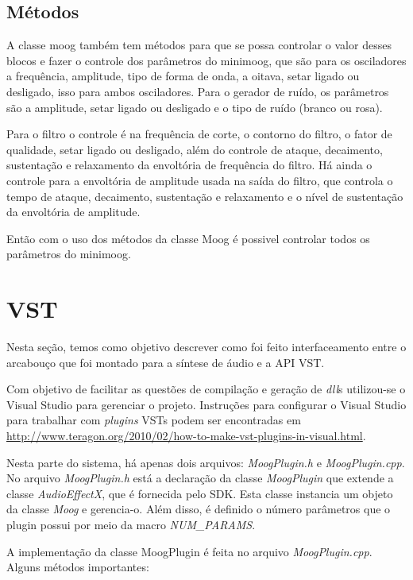 \documentclass{article}
\begin{document}
  
\subsection{Métodos}
A classe moog também tem métodos para que se possa controlar o valor desses blocos e fazer o controle dos parâmetros do minimoog, que são
 para os osciladores a frequência, amplitude, tipo de forma de onda, a oitava, setar ligado ou desligado, isso para ambos osciladores.
Para o gerador de ruído, os parâmetros são a amplitude, setar ligado ou desligado e o tipo de ruído (branco ou rosa).


Para o filtro o controle é na frequência de corte, o contorno do filtro, o fator de qualidade, setar ligado ou desligado, além do controle
 de ataque, decaimento, sustentação e relaxamento da envoltória de frequência do filtro.
Há ainda o controle para a envoltória de amplitude usada na saída do filtro, que controla o tempo de ataque, decaimento, sustentação e 
relaxamento e o nível de sustentação da envoltória de amplitude.


Então com o uso dos métodos da classe Moog é possivel controlar todos os parâmetros do minimoog.







\section{VST}
Nesta seção, temos como objetivo 
descrever como foi feito interfaceamento entre o arcabouço que foi montado 
para a síntese de áudio e a API VST.



Com objetivo de facilitar as questões de compilação e geração de \emph{dll}s 
utilizou-se o Visual Studio para gerenciar o projeto. Instruções para configurar 
o Visual Studio para trabalhar com \emph{plugins} VSTs podem ser encontradas em 
\url{http://www.teragon.org/2010/02/how-to-make-vst-plugins-in-visual.html}.

Nesta parte do sistema, há apenas dois arquivos: \emph{MoogPlugin.h} e \emph{MoogPlugin.cpp}.
No arquivo \emph{MoogPlugin.h} está a declaração da classe \emph{MoogPlugin} que 
extende a classe \emph{AudioEffectX}, que é fornecida pelo SDK. Esta classe instancia 
um objeto da classe \emph{Moog} e gerencia-o. Além disso, é 
definido o número parâmetros que o plugin possui por meio da macro \emph{NUM\_PARAMS}.

A implementação da classe MoogPlugin é feita no arquivo \emph{MoogPlugin.cpp}. Alguns 
métodos importantes:
\end{document}
